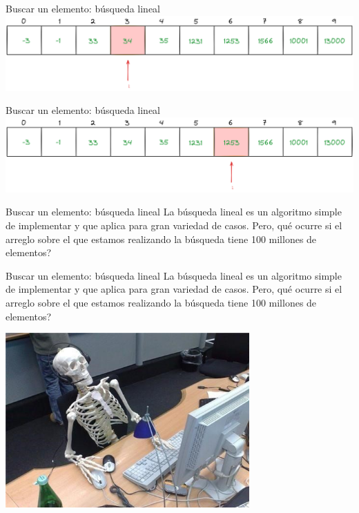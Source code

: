\documentclass[12pt]{beamer}
\begin{document}
\begin{frame}{Buscar un elemento: búsqueda lineal}
    \includegraphics[width=\textwidth]{busqueda_lineal_4.png}
\end{frame}

\begin{frame}{Buscar un elemento: búsqueda lineal}
    \includegraphics[width=\textwidth]{busqueda_lineal_final.png}
\end{frame}

\begin{frame}{Buscar un elemento: búsqueda lineal}
    La \alert{búsqueda lineal} es un algoritmo simple de implementar y que aplica para gran variedad de casos. Pero, qué ocurre si el arreglo sobre el que estamos realizando la búsqueda tiene 100 millones de elementos?
\end{frame}

\begin{frame}{Buscar un elemento: búsqueda lineal}
    La \alert{búsqueda lineal} es un algoritmo simple de implementar y que aplica para gran variedad de casos. Pero, qué ocurre si el arreglo sobre el que estamos realizando la búsqueda tiene 100 millones de elementos?
    
    \medskip

    \begin{center}
        \includegraphics[width=0.7\textwidth]{skeleton_meme.jpg}
    \end{center}
\end{frame}
\end{document}
